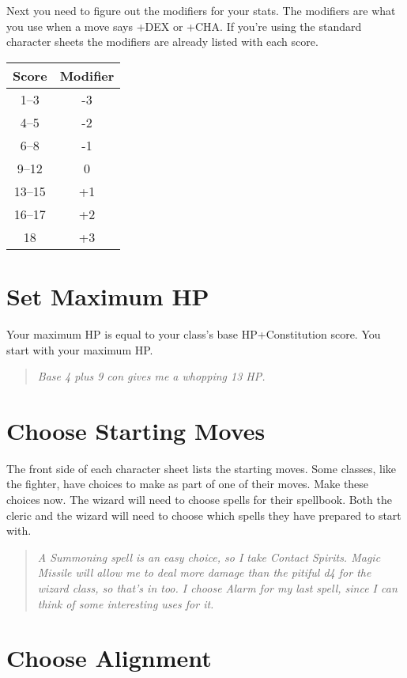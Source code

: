 Next you need to figure out the modifiers for your stats. The modifiers are what you use when a move says +DEX or +CHA\@. If you're using the standard character sheets the modifiers are already listed with each score.
\begin{center}
\begin{tabular}{|c|c|}\hline
Score & Modifier \\ \hline
1--3 & -3\\ \hline
4--5 & -2\\ \hline
6--8 & -1\\ \hline
9--12 & 0\\ \hline
13--15 & +1\\ \hline
16--17 & +2\\ \hline
18 & +3\\ \hline
\end{tabular}
\end{center}
\section{Set Maximum HP}


 Your maximum HP is equal to your class's base HP+Constitution score. You start with your maximum HP\@.


\begin{quote}
\emph{Base 4 plus 9 con gives me a whopping 13 HP\@. }
\end{quote}
\section{Choose Starting Moves} 


 The front side of each character sheet lists the starting moves. Some classes, like the fighter, have choices to make as part of one of their moves. Make these choices now. The wizard will need to choose spells for their spellbook. Both the cleric and the wizard will need to choose which spells they have prepared to start with.

\begin{quote}
\emph{A Summoning spell is an easy choice, so I take Contact Spirits. Magic Missile will allow me to deal more damage than the pitiful d4 for the wizard class, so that's in too. I choose Alarm for my last spell, since I can think of some interesting uses for it.}
\end{quote}
\section{Choose Alignment}


